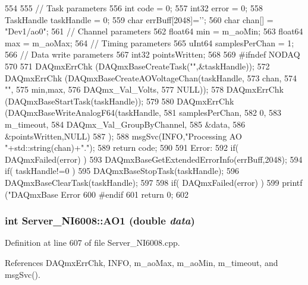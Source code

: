 \begin{DoxyCode}
554                                  {
555   // Task parameters
556   int         code  = 0;
557   int32       error = 0;
558   TaskHandle  taskHandle = 0;
559   char        errBuff[2048]={'\0'};
560   char        chan[] = "Dev1/ao0\0";
561   // Channel parameters
562   float64     min = m_aoMin;
563   float64     max = m_aoMax;
564   // Timing parameters
565   uInt64      samplesPerChan = 1;
566   // Data write parameters
567   int32       pointsWritten;
568 
569 #ifndef NODAQ
570   
571   DAQmxErrChk (DAQmxBaseCreateTask("",&taskHandle));
572   DAQmxErrChk (DAQmxBaseCreateAOVoltageChan(taskHandle,
573                         chan,
574                         "",
575                         min,max,
576                         DAQmx_Val_Volts,
577                         NULL));
578   DAQmxErrChk (DAQmxBaseStartTask(taskHandle));
579   
580   DAQmxErrChk (DAQmxBaseWriteAnalogF64(taskHandle,
581                        samplesPerChan,
582                        0,
583                        m_timeout,
584                        DAQmx_Val_GroupByChannel,
585                        &data,
586                        &pointsWritten,NULL)
587            );
588   msgSvc(INFO,"Processing AO "+std::string(chan)+".");
589   return code;
590 
591 Error:
592     if( DAQmxFailed(error) )
593         DAQmxBaseGetExtendedErrorInfo(errBuff,2048);
594     if( taskHandle!=0 ) {
595         DAQmxBaseStopTask(taskHandle);
596         DAQmxBaseClearTask(taskHandle);
597     }
598     if( DAQmxFailed(error) )
599         printf ("DAQmxBase Error %
600 #endif
601     return 0;
602 }
\end{DoxyCode}
\hypertarget{classServer__NI6008_a130bb6bca52d5c779491c51975e6ffda}{
\subsubsection[{AO1}]{\setlength{\rightskip}{0pt plus 5cm}int Server\_\-NI6008::AO1 (double {\em data})}}
\label{classServer__NI6008_a130bb6bca52d5c779491c51975e6ffda}


Definition at line 607 of file Server\_\-NI6008.cpp.

References DAQmxErrChk, INFO, m\_\-aoMax, m\_\-aoMin, m\_\-timeout, and msgSvc().



